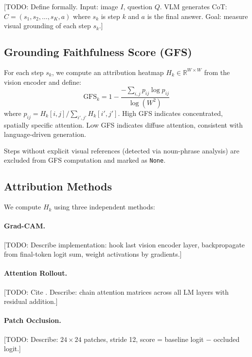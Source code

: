 \documentclass{colm2026}
\begin{document}
[TODO: Define formally. Input: image $I$, question $Q$.
VLM generates CoT: $C = (s_1, s_2, \ldots, s_K, a)$ where $s_k$ is step $k$
and $a$ is the final answer.
Goal: measure visual grounding of each step $s_k$.]

\subsection{Grounding Faithfulness Score (GFS)}
\label{sec:gfs}

For each step $s_k$, we compute an attribution heatmap $H_k \in \mathbb{R}^{W \times W}$
from the vision encoder and define:
\begin{equation}
  \text{GFS}_k = 1 - \frac{-\sum_{i,j} p_{ij} \log p_{ij}}{\log(W^2)}
  \label{eq:gfs}
\end{equation}
where $p_{ij} = H_k[i,j] / \sum_{i',j'} H_k[i',j']$.
High GFS indicates concentrated, spatially specific attention.
Low GFS indicates diffuse attention, consistent with language-driven generation.

Steps without explicit visual references (detected via noun-phrase analysis) are
excluded from GFS computation and marked as \texttt{None}.

\subsection{Attribution Methods}
\label{sec:attribution}

We compute $H_k$ using three independent methods:

\paragraph{Grad-CAM.} [TODO: Describe implementation: hook last vision encoder layer,
backpropagate from final-token logit sum, weight activations by gradients.]

\paragraph{Attention Rollout.} [TODO: Cite \citep{abnar2020rollout}. Describe:
chain attention matrices across all LM layers with residual addition.]

\paragraph{Patch Occlusion.} [TODO: Describe: $24 \times 24$ patches, stride 12,
score = baseline logit $-$ occluded logit.]
\end{document}
